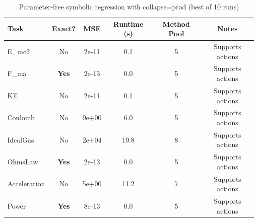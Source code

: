 \begin{table}[h]
\centering
\caption{Parameter-free symbolic regression with collapse=prod (best of 10 runs)}
\label{tab:baselines_prod}
\begin{tabular}{lccccc}
\toprule
Task & Exact? & MSE & Runtime (s) & Method Pool & Notes \\
\midrule
E_mc2 & No & 2e-11 & 0.1 & 5 & Supports actions \\
\midrule
F_ma & \textbf{Yes} & 2e-13 & 0.0 & 5 & Supports actions \\
\midrule
KE & No & 2e-11 & 0.1 & 5 & Supports actions \\
\midrule
Coulomb & No & 9e+00 & 6.0 & 5 & Supports actions \\
\midrule
IdealGas & No & 2e+04 & 19.8 & 8 & Supports actions \\
\midrule
OhmsLaw & \textbf{Yes} & 2e-13 & 0.0 & 5 & Supports actions \\
\midrule
Acceleration & No & 5e+00 & 11.2 & 7 & Supports actions \\
\midrule
Power & \textbf{Yes} & 8e-13 & 0.0 & 5 & Supports actions \\
\midrule
\bottomrule
\end{tabular}
\end{table}